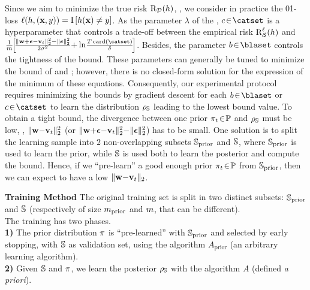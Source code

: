 Since we aim to minimize the true risk $\Risk_{\D}(\h)$, \ie, we consider in practice the 01-loss $\loss(\h,(\x,\y))=\indic\LB\h(\x)\ne \y\RB$.
As the parameter $\lambda$ of the , $c\!\in\!\catset$ is a hyperparameter that controls a trade-off between the empirical risk $\RiskLoss_{\dS}(\h)$ and $\frac{1}{\m}\!\!\left[\! \frac{\| \wbf{+}\epsilonbf{-}\vbf_\t\|^2_{2} {-}\|\epsilonbf\|^2_{2}}{2\sigma^2} {+} \ln\!\frac{\iter\card(\catset)}{\delta}\!\right]$.
Besides, the parameter $b\!\in\!\blaset$ controls the tightness of the bound. 
These parameters can generally be tuned to minimize the bound of  and ; however, there is no closed-form solution for the expression of the minimum of these equations.
Consequently, our experimental protocol requires minimizing the bounds by gradient descent for each $b\!\in\!\blaset$ or $c\!\in\!\catset$ to learn the distribution $\AQ$ leading to the lowest bound value.
To obtain a tight bound, the divergence between one prior $\P_\t\!\in\!\priorset$ and $ \AQ$ must be low, \ie,  $\| \wbf{-}\vbf_\t\|_{2}^2$ (or $\| \wbf{+}\epsilonbf{-}\vbf_\t\|_{2}^2{-}\|\epsilonbf\|^2_{2}$) has to be small.
One solution 
is to split the learning sample into $2$ non-overlapping subsets  $\S_{\text{prior}}$ and $\S$, where $\S_{\text{prior}}$ is used to learn the prior, while $\S$ is used both to learn the posterior and compute the bound.
Hence, if we ``pre-learn'' a good enough prior $\P_\t\!\in\!\priorset$ from $\S_{\text{prior}}$, then we can expect to have a low \mbox{$\| \wbf{-}\vbf_\t\|_{2}$}.

\begin{minipage}{1.0\linewidth}
\begin{training}{\bf Training Method}
The original training set is split in two distinct subsets: $\S_{\text{prior}}$  and $\S$ (respectively of size $\m_{\text{prior}}$ and $\m$, that can be different).\\
The training has two phases.\\
{\bf 1)} The prior distribution $\P$ is ``pre-learned'' with $\S_{\text{prior}}$ and selected by early stopping,  with $\S$ as validation set, using the algorithm $A_{\text{prior}}$ (an arbitrary learning algorithm).\\
{\bf 2)} Given $\S$ and $\P$, we learn the posterior $\AQ$ with the algorithm $A$ (defined {\it a priori}).
\end{training}
\end{minipage}\\

